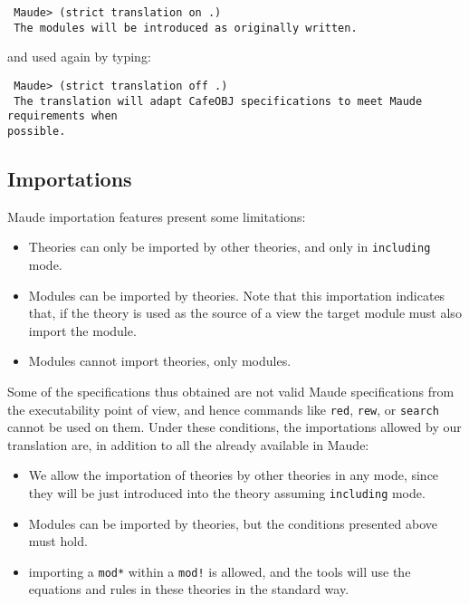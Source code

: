 {\codesize
\begin{verbatim}
 Maude> (strict translation on .)
 The modules will be introduced as originally written.
\end{verbatim}
}

\noindent
and used again by typing:

{\codesize
\begin{verbatim}
 Maude> (strict translation off .)
 The translation will adapt CafeOBJ specifications to meet Maude requirements when 
possible.
\end{verbatim}
}

\subsection{Importations}

Maude importation features present some limitations:

\begin{itemize}
\item
Theories can only be imported by other theories, and only in \verb"including" mode.

\item
Modules can be imported by theories. Note that this importation indicates that, if the
theory is used as the source of a view the target module must also import the module.

\item
Modules cannot import theories, only modules.
\end{itemize}

Some of the specifications thus
obtained are not valid Maude specifications from the executability point of view, and hence
commands like \texttt{red}, \texttt{rew}, or \texttt{search} cannot be used on them.
%
Under these conditions, the importations allowed by our translation are, in addition to all the
already available in Maude:
\begin{itemize}
\item
We allow the importation of theories by other theories in any mode, since they will be
just introduced into the theory assuming \verb"including" mode.

\item
Modules can be imported by theories, but the conditions presented above must hold.

\item
importing a \verb"mod*" within a \verb"mod!" is allowed, and the tools will use the equations
and rules in these theories in the standard way.
\end{itemize}

